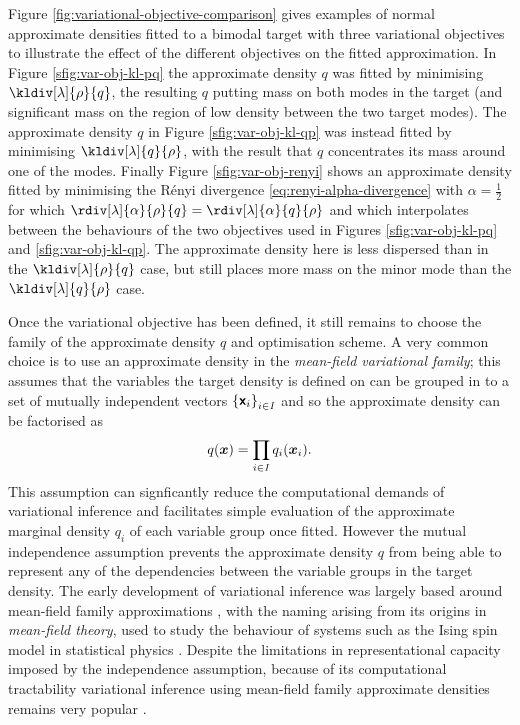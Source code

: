 Figure \ref{fig:variational-objective-comparison} gives examples of normal approximate densities fitted to a bimodal target with three variational objectives to illustrate the effect of the different objectives on the fitted approximation. In Figure \ref{sfig:var-obj-kl-pq} the approximate density $q$ was fitted by minimising $\kldiv[\lambda]{\rho}{q}$, the resulting $q$ putting mass on both modes in the target (and significant mass on the region of low density between the two target modes). The approximate density $q$ in Figure \ref{sfig:var-obj-kl-qp} was instead fitted by minimising $\kldiv[\lambda]{q}{\rho}$, with the result that $q$ concentrates its mass around one of the modes. Finally Figure \ref{sfig:var-obj-renyi} shows an approximate density fitted by minimising the R\'{e}nyi divergence \eqref{eq:renyi-alpha-divergence} with $\alpha = \frac{1}{2}$ for which $\rdiv[\lambda]{\alpha}{\rho}{q} = \rdiv[\lambda]{\alpha}{q}{\rho}$ and which interpolates between the behaviours of the two objectives used in Figures \ref{sfig:var-obj-kl-pq} and \ref{sfig:var-obj-kl-qp}. The approximate density here is less dispersed than in the $\kldiv[\lambda]{\rho}{q}$ case, but still places more mass on the minor mode than the $\kldiv[\lambda]{q}{\rho}$ case.

Once the variational objective has been defined, it still remains to choose the family of the approximate density $q$ and optimisation scheme. 
A very common choice is to use an approximate density in the \emph{mean-field variational family}; this assumes that the variables the target density is defined on can be grouped in to a set of mutually independent vectors $\fset{\rvct{x}_i}_{i\in\set{I}}$ and so the approximate density can be factorised as
\begin{equation}\label{eq:mean-field-variational-family}
  q(\boldsymbol{x}) = \prod_{i\in\mathit{I}} q_i(\boldsymbol{x}_i).
\end{equation}
This assumption can signficantly reduce the computational demands of variational inference and facilitates simple evaluation of the approximate marginal density $q_{i}$ of each variable group once fitted. However the mutual independence assumption prevents the approximate density $q$ from being able to represent any of the dependencies between the variable groups in the target density. The early development of variational inference was largely based around mean-field family approximations \citep{peterson1987mean,saul1996mean}, with the naming arising from its origins in \emph{mean-field theory}, used to study the behaviour of systems such as the Ising spin model in statistical physics \citep{parisi1998statistical}. Despite the limitations in representational capacity imposed by the independence assumption, because of its computational tractability variational inference using mean-field family approximate densities remains very popular \citep{blei2017variational}.

